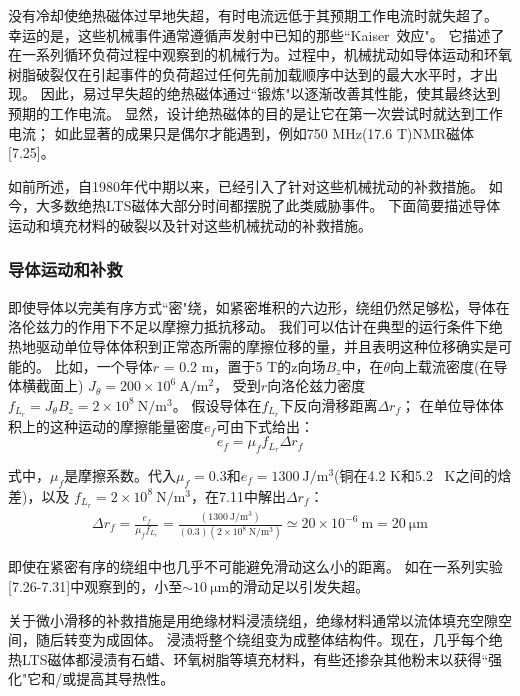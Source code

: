 没有冷却使绝热磁体过早地失超，有时电流远低于其预期工作电流时就失超了。
幸运的是，这些机械事件通常遵循声发射中已知的那些``Kaiser~效应"。
它描述了在一系列循环负荷过程中观察到的机械行为。过程中，机械扰动如导体运动和环氧树脂破裂仅在引起事件的负荷超过任何先前加载顺序中达到的最大水平时，才出现。
因此，易过早失超的绝热磁体通过``锻炼"以逐渐改善其性能，使其最终达到预期的工作电流。
显然，设计绝热磁体的目的是让它在第一次尝试时就达到工作电流；
如此显著的成果只是偶尔才能遇到，例如750 MHz(17.6 T)NMR磁体[7.25]。

如前所述，自1980年代中期以来，已经引入了针对这些机械扰动的补救措施。
如今，大多数绝热LTS磁体大部分时间都摆脱了此类威胁事件。
下面简要描述导体运动和填充材料的破裂以及针对这些机械扰动的补救措施。

\subsubsection*{导体运动和补救}
即使导体以完美有序方式``密"绕，如紧密堆积的六边形，绕组仍然足够松，导体在洛伦兹力的作用下不足以摩擦力抵抗移动。
我们可以估计在典型的运行条件下绝热地驱动单位导体体积到正常态所需的摩擦位移的量，并且表明这种位移确实是可能的。
比如，一个导体$r$ = 0.2 m，置于5 T的z向场$B_z$中，在$\theta$向上载流密度(在导体横截面上)
$J_\theta= 200\times 10^6\ \mathrm{A/m^2}$，
受到$r$向洛伦兹力密度$f_{L_r} =J_\theta B_z=2\times 10^8\ \mathrm{N/m^3}$。
假设导体在$f_{L_r}$下反向滑移距离$\Delta r_f$；
在单位导体体积上的这种运动的摩擦能量密度$e_f$可由下式给出：
\begin{equation}%
e_f=\mu_ff_{L_r}\Delta r_f
\end{equation}

式中，$\mu_f$是摩擦系数。代入$\mu_f=0.3$和$e_f=1300\ \mathrm{J/m^3}$(铜在4.2 K和5.2~ K之间的焓差)，以及
$f_{L_r}=2\times 10^8\ \mathrm{N/m^3}$，在7.11中解出$\Delta r_f$：
\begin{align*}%
\Delta r_f=\frac{e_f}{\mu_ff_{L_r}}=\frac{(1300\ \mathrm{J/m^3})}{(0.3)(2\times 10^8\ \mathrm{N/m^3})}\simeq 20\times 10^{-6}\ \mathrm{m}=20\ \mathrm{\mu m}
\end{align*}

即使在紧密有序的绕组中也几乎不可能避免滑动这么小的距离。
如在一系列实验[7.26-7.31]中观察到的，小至$\sim 10\ \mathrm{\mu m}$的滑动足以引发失超。

关于微小滑移的补救措施是用绝缘材料浸渍绕组，绝缘材料通常以流体填充空隙空间，随后转变为成固体。
浸渍将整个绕组变为成整体结构件。现在，几乎每个绝热LTS磁体都浸渍有石蜡、环氧树脂等填充材料，有些还掺杂其他粉末以获得``强化"它和/或提高其导热性。
 

